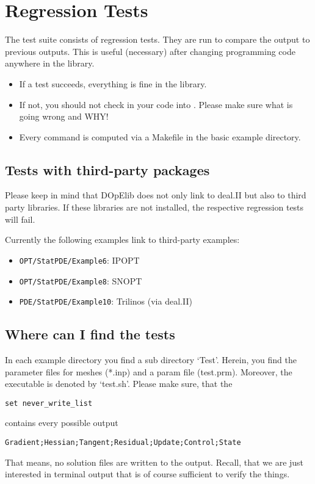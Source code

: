 \chapter{Regression Tests}\label{chap:test}
The \dope{} test suite consists of regression tests. They are run to compare 
the output to previous outputs. This is useful (necessary) after 
changing programming code anywhere in the library. 

\begin{itemize}
\item If a test
succeeds, everything is fine in the library. 
\item If not, you should not
check in your code into \dope{}. 
Please make sure what is going wrong and WHY!
\item 
Every command is computed via a Makefile in the basic example 
directory.
\end{itemize}

\section{Tests with third-party packages}
Please keep in mind that DOpElib does not 
only link to deal.II but also to third party libraries.
If these libraries are not installed, the respective regression tests 
will fail. 

Currently the following examples link to third-party examples:
\begin{itemize}
\item \texttt{OPT/StatPDE/Example6}: IPOPT
\item \texttt{OPT/StatPDE/Example8}: SNOPT
\item \texttt{PDE/StatPDE/Example10}: Trilinos (via deal.II)
\end{itemize}


\section{Where can I find the tests}
In each example directory you find a sub directory `Test'. Herein, you find 
the parameter files for meshes (*.inp) and a param file (test.prm).
Moreover, the executable is denoted by `test.sh'. Please make sure, that 
the 
\begin{verbatim}
set never_write_list
\end{verbatim}
contains every possible output
\begin{verbatim}
Gradient;Hessian;Tangent;Residual;Update;Control;State
\end{verbatim}
That means, no solution files are written to the output.
Recall, that we are just interested in terminal output that 
is of course sufficient to verify the things.

